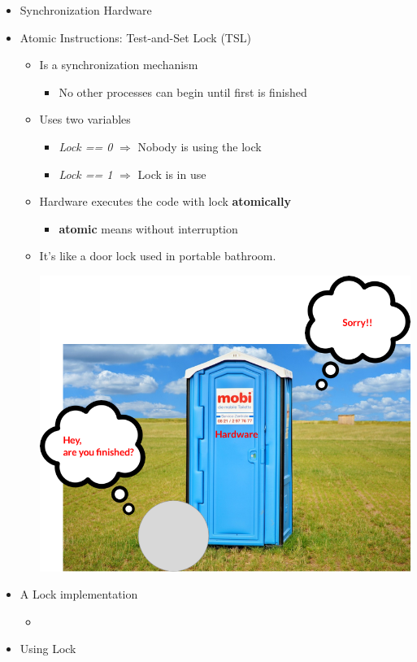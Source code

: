 \documentclass[12pt]{article}
\begin{document}
\begin{itemize}
    \item Synchronization Hardware
    \item Atomic Instructions: Test-and-Set Lock (TSL)
    \begin{itemize}
        \item Is a synchronization mechanism
        \begin{itemize}
            \item No other processes can begin until first is finished
        \end{itemize}
        \item Uses two variables
        \begin{itemize}
            \item \textit{Lock == 0} $\Rightarrow$ Nobody is using the lock
            \item \textit{Lock == 1} $\Rightarrow$ Lock is in use
        \end{itemize}
        \item Hardware executes the code with lock \textbf{atomically}
        \begin{itemize}
            \item \textbf{atomic} means without interruption
        \end{itemize}
        \item It's like a door lock used in portable bathroom.

        \begin{center}
        \includegraphics[width=0.8\linewidth]{images/week_2_notes_2_13.png}
        \end{center}

    \end{itemize}
    \item A Lock implementation
    \begin{itemize}
        \item
    \end{itemize}
    \item Using Lock
\end{itemize}
\end{document}
